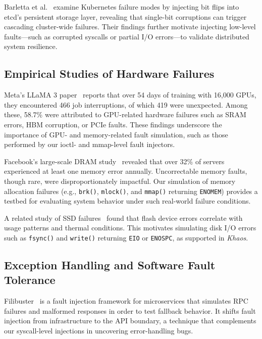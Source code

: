 Barletta et al.~\cite{mutiny2024} examine Kubernetes failure modes by injecting bit flips into etcd's persistent storage layer, revealing that single-bit corruptions can trigger cascading cluster-wide failures. Their findings further motivate injecting low-level faults—such as corrupted syscalls or partial I/O errors—to validate distributed system resilience.

\subsection{Empirical Studies of Hardware Failures}

Meta's LLaMA 3 paper~\cite{llama3herdmodels} reports that over 54 days of training with 16,000 GPUs, they encountered 466 job interruptions, of which 419 were unexpected. Among these, 58.7\% were attributed to GPU-related hardware failures such as SRAM errors, HBM corruption, or PCIe faults. These findings underscore the importance of GPU- and memory-related fault simulation, such as those performed by our ioctl- and mmap-level fault injectors.

Facebook's large-scale DRAM study~\cite{facebookdramstudy} revealed that over 32\% of servers experienced at least one memory error annually. Uncorrectable memory faults, though rare, were disproportionately impactful. Our simulation of memory allocation failures (e.g., \texttt{brk()}, \texttt{mlock()}, and \texttt{mmap()} returning \texttt{ENOMEM}) provides a testbed for evaluating system behavior under such real-world failure conditions.

A related study of SSD failures~\cite{facebookssdstudy} found that flash device errors correlate with usage patterns and thermal conditions. This motivates simulating disk I/O errors such as \texttt{fsync()} and \texttt{write()} returning \texttt{EIO} or \texttt{ENOSPC}, as supported in \textit{Khaos}.

\subsection{Exception Handling and Software Fault Tolerance}

Filibuster~\cite{filibuster2024} is a fault injection framework for microservices that simulates RPC failures and malformed responses in order to test fallback behavior. It shifts fault injection from infrastructure to the API boundary, a technique that complements our syscall-level injections in uncovering error-handling bugs.

